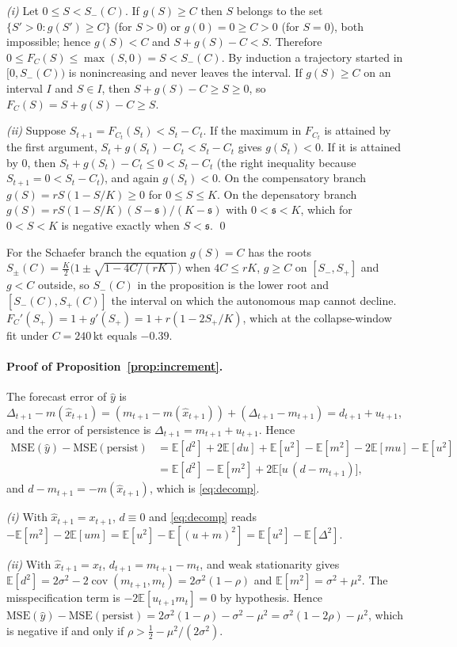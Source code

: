 \documentclass[preprint,11pt,authoryear]{elsarticle}
\theoremstyle{definition}
\theoremstyle{remark}
\newcommand{\kt}{\,\mathrm{kt}}
\newcommand{\MSE}{\mathrm{MSE}}
\newcommand{\pers}{\mathrm{persist}}
\newcommand{\sA}{\mathfrak{s}}
\newcommand{\E}{\mathbb{E}}
\begin{document}
\emph{(i)} Let $0 \le S < S_-(C)$. If $g(S) \ge C$ then $S$ belongs to the set $\{S'>0 : g(S')\ge C\}$ (for $S>0$) or $g(0)=0\ge C>0$ (for $S=0$), both impossible; hence $g(S) < C$ and $S + g(S) - C < S$. Therefore $0 \le F_C(S) \le \max(S,0) = S < S_-(C)$. By induction a trajectory started in $[0,S_-(C))$ is nonincreasing and never leaves the interval. If $g(S) \ge C$ on an interval $I$ and $S\in I$, then $S + g(S) - C \ge S \ge 0$, so $F_C(S) = S + g(S) - C \ge S$.

\emph{(ii)} Suppose $S_{t+1} = F_{C_t}(S_t) < S_t - C_t$. If the maximum in $F_{C_t}$ is attained by the first argument, $S_t + g(S_t) - C_t < S_t - C_t$ gives $g(S_t) < 0$. If it is attained by $0$, then $S_t + g(S_t) - C_t \le 0 < S_t - C_t$ (the right inequality because $S_{t+1} = 0 < S_t - C_t$), and again $g(S_t) < 0$. On the compensatory branch $g(S) = rS(1-S/K) \ge 0$ for $0 \le S \le K$. On the depensatory branch $g(S) = rS(1-S/K)(S-\sA)/(K-\sA)$ with $0<\sA<K$, which for $0<S<K$ is negative exactly when $S<\sA$. \qed

For the Schaefer branch the equation $g(S)=C$ has the roots $S_\pm(C) = \tfrac{K}{2}\bigl(1\pm\sqrt{1-4C/(rK)}\bigr)$ when $4C\le rK$, $g\ge C$ on $[S_-,S_+]$ and $g<C$ outside, so $S_-(C)$ in the proposition is the lower root and $[S_-(C),S_+(C)]$ the interval on which the autonomous map cannot decline. $F_C'(S_+) = 1 + g'(S_+) = 1 + r(1-2S_+/K)$, which at the collapse-window fit under $C=240\kt$ equals $-0.39$.

\paragraph{Proof of Proposition~\ref{prop:increment}.} The forecast error of $\hat y$ is $\Delta_{t+1}-m(\hat x_{t+1}) = (m_{t+1}-m(\hat x_{t+1})) + (\Delta_{t+1}-m_{t+1}) = d_{t+1}+u_{t+1}$, and the error of persistence is $\Delta_{t+1} = m_{t+1}+u_{t+1}$. Hence
\begin{align*}
\MSE(\hat y)-\MSE(\pers) &= \E[d^2]+2\E[du]+\E[u^2] - \E[m^2]-2\E[mu]-\E[u^2]\\
&= \E[d^2]-\E[m^2] + 2\E\bigl[u\,(d-m_{t+1})\bigr],
\end{align*}
and $d-m_{t+1} = -m(\hat x_{t+1})$, which is \eqref{eq:decomp}.

\emph{(i)} With $\hat x_{t+1}=x_{t+1}$, $d\equiv 0$ and \eqref{eq:decomp} reads $-\E[m^2]-2\E[um] = \E[u^2]-\E[(u+m)^2] = \E[u^2]-\E[\Delta^2]$.

\emph{(ii)} With $\hat x_{t+1}=x_t$, $d_{t+1}=m_{t+1}-m_t$, and weak stationarity gives $\E[d^2] = 2\sigma^2 - 2\operatorname{cov}(m_{t+1},m_t) = 2\sigma^2(1-\rho)$ and $\E[m^2]=\sigma^2+\mu^2$. The misspecification term is $-2\E[u_{t+1}m_t]=0$ by hypothesis. Hence $\MSE(\hat y)-\MSE(\pers) = 2\sigma^2(1-\rho)-\sigma^2-\mu^2 = \sigma^2(1-2\rho)-\mu^2$, which is negative if and only if $\rho > \tfrac12 - \mu^2/(2\sigma^2)$.
\end{document}
